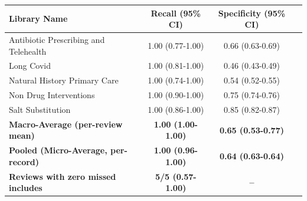 \begin{tabularx}{\textwidth}{@{} X c c c @{}}
\toprule
\textbf{Library Name} & \textbf{Recall (95\% CI)} & \textbf{Specificity (95\% CI)} \\
\midrule
Antibiotic Prescribing and Telehealth & 1.00 (0.77-1.00) & 0.66 (0.63-0.69) \\
Long Covid & 1.00 (0.81-1.00) & 0.46 (0.43-0.49) \\
Natural History Primary Care & 1.00 (0.74-1.00) & 0.54 (0.52-0.55) \\
Non Drug Interventions & 1.00 (0.90-1.00) & 0.75 (0.74-0.76) \\
Salt Substitution & 1.00 (0.86-1.00) & 0.85 (0.82-0.87) \\
\midrule
\textbf{Macro-Average (per-review mean)} & \textbf{1.00 (1.00-1.00)} & \textbf{0.65 (0.53-0.77)} \\
\textbf{Pooled (Micro-Average, per-record)} & \textbf{1.00 (0.96-1.00)} & \textbf{0.64 (0.63-0.64)} \\
\textbf{Reviews with zero missed includes} & \textbf{5/5 (0.57-1.00)} & \textbf{--} \\
\bottomrule
\end{tabularx}
